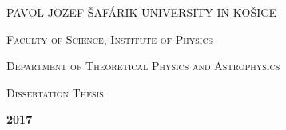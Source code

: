 \documentclass[12pt, english, 
oneside, 
onehalfspacing, %
toctotoc, %
headsepline, %
]{MastersDoctoralThesis} %
\author{Mgr. Viktor \textsc{Kudak}} %
\begin{document}
\frontmatter %

\pagestyle{plain} %


\begin{titlepage}
\begin{center}

{\scshape\Large PAVOL JOZEF \v{S}AF\'{A}RIK UNIVERSITY IN KO\v{S}ICE \par}\vspace{0.1cm} %
{\scshape\Large Faculty of Science, Institute of Physics \par}\vspace{0.2cm}
{\scshape Department of Theoretical Physics and Astrophysics \par}\vspace{3.5cm}


{\huge \bfseries \ttitle\par}\vspace{2.9cm} %


\textsc{\Large Dissertation Thesis}\\[6cm] %

\begin{minipage}[t]{0.4\textwidth}
\begin{flushleft} \large
{\bfseries 2017} 
\end{flushleft}
\end{minipage}
\begin{minipage}[t]{0.4\textwidth}
\begin{flushright} \large
{\bfseries \authorname} %
\end{flushright}
\end{minipage}\\[3cm]
\vfill
\end{center}
\end{titlepage}

\end{document}
